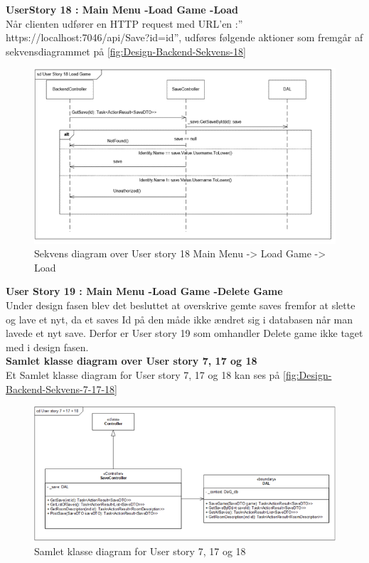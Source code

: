 \textbf{UserStory 18 : Main Menu -\g Load Game -\g Load}\\
Når clienten udfører en HTTP request med URL’en :” https://localhost:7046/api/Save?id={id}”, udføres følgende aktioner som fremgår af sekvensdiagrammet på \autoref{fig:Design-Backend-Sekvens-18}\\

\begin{figure}[H]
\centering
\includegraphics[width = \textwidth]{02-Body/Images/Backend_sekvens_18.PNG}
\caption{Sekvens diagram over User story 18 Main Menu -> Load Game -> Load}
\label{fig:Design-Backend-Sekvens-18}
\end{figure}

\textbf{User Story 19 : Main Menu -\g Load Game -\g Delete Game}\\

Under design fasen blev det besluttet at overskrive gemte saves fremfor at slette og lave et nyt, da et saves Id på den måde ikke ændret sig i databasen når man lavede et nyt save. Derfor er User story 19 som omhandler Delete game ikke taget med i design fasen.\\

\textbf{Samlet klasse diagram over User story 7, 17 og 18}\\
Et Samlet klasse diagram for User story 7, 17 og 18 kan ses på \autoref{fig:Design-Backend-Sekvens-7-17-18}\\

\begin{figure}[H]
\centering
\includegraphics[width = \textwidth]{02-Body/Images/Backend_klasse_7_17_18.PNG}
\caption{Samlet klasse diagram for User story 7, 17 og 18}
\label{fig:Design-Backend-Sekvens-7-17-18}
\end{figure}

